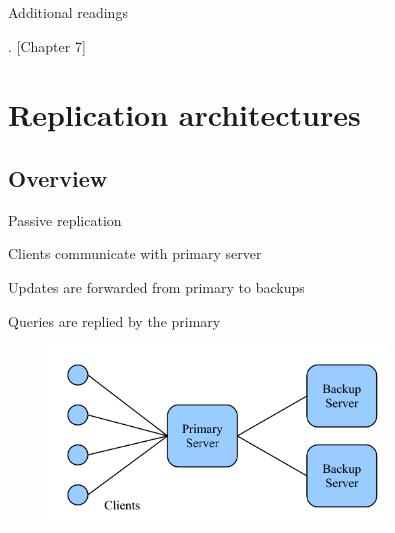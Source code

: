 \begin{frame}{Additional readings}

\begin{Bib}
{\footnotesize
\BI
\item \alert{}
\item {}
\item {}. [Chapter 7]
\EI
}
\end{Bib}

% 
%  

\end{frame}



\section{Replication architectures}

\subsection{Overview}


\begin{frame}{Passive replication}
\BI
\item Clients communicate with primary server
\item Updates are forwarded from primary to backups
\item Queries are replied by the primary	
\EI

\begin{figure}
	\includegraphics[width=0.8\textwidth]{figs/09/primarybackup}
\end{figure}

\end{frame}

